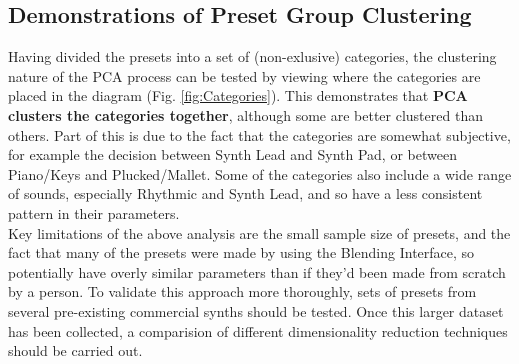 \documentclass[11pt, oneside]{report}   	%
\begin{document}
\subsection{Demonstrations of Preset Group Clustering}
Having divided the presets into a set of (non-exlusive) categories, the clustering nature of the PCA process can be tested by viewing where the categories are placed in the diagram (Fig. \ref{fig:Categories}). This demonstrates that \textbf{PCA clusters the categories together}, although some are better clustered than others. Part of this is due to the fact that the categories are somewhat subjective, for example the decision between Synth Lead and Synth Pad, or between Piano/Keys and Plucked/Mallet. Some of the categories also include a wide range of sounds, especially Rhythmic and Synth Lead, and so have a less consistent pattern in their parameters.\\
Key limitations of the above analysis are the small sample size of presets, and the fact that many of the presets were made by using the Blending Interface, so potentially have overly similar parameters than if they'd been made from scratch by a person. To validate this approach more thoroughly, sets of presets from several pre-existing commercial synths should be tested. Once this larger dataset has been collected, a comparision of different dimensionality reduction techniques should be carried out.
\end{document}
